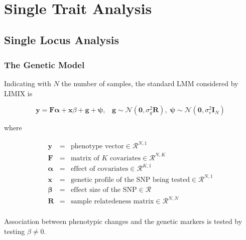 \documentclass{article}
\begin{document}
    \begin{center}
    \end{center}
    { \hspace*{\fill} \\}
    

    \section{Single Trait Analysis}



    \subsection{Single Locus Analysis}



    \subsubsection{The Genetic Model}


    Indicating with $N$ the number of samples, the standard LMM considered
by LIMIX is

\begin{equation}
\mathbf{y} = \mathbf{F}\boldsymbol{\alpha} + \mathbf{x}\beta + \mathbf{g}+\boldsymbol{\psi},\;\;\;
\mathbf{g}\sim\mathcal{N}\left(\mathbf{0},\sigma_g^2\mathbf{R}\right),\;
\boldsymbol{\psi}\sim\mathcal{N}\left(\mathbf{0},\sigma_e^2\mathbf{I}_N\right)
\end{equation}

where

\begin{eqnarray}
\mathbf{y}   &=& \text{phenotype vector} \in \mathcal{R}^{N,1} \\
\mathbf{F}   &=& \text{matrix of $K$ covariates} \in \mathcal{R}^{N,K} \\
\boldsymbol{\alpha} &=& \text{effect of covariates} \in \mathcal{R}^{K,1} \\
\mathbf{x}   &=& \text{genetic profile of the SNP being tested} \in \mathcal{R}^{N,1} \\
\boldsymbol{\beta}   &=& \text{effect size of the SNP} \in \mathcal{R} \\
\mathbf{R}   &=& \text{sample relatedeness matrix} \in \mathcal{R}^{N,N} \\
\end{eqnarray}

Association between phenotypic changes and the genetic markers is tested
by testing $\beta\neq0$.
\end{document}
